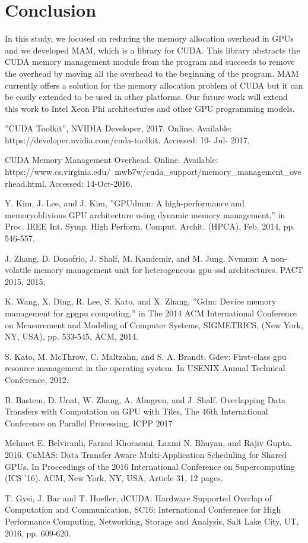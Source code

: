 \documentclass[conference]{IEEEtran}
\begin{document}
\section{Conclusion}
In this study, we focused on reducing the memory allocation overhead in GPUs and we developed MAM, which is a library for CUDA. This library abstracts the CUDA memory management module from the program and succeeds to remove the overhead by moving all the overhead to the beginning of the program. MAM currently offers a solution for the memory allocation problem of CUDA but it can be easily extended to be used in other platforms. Our future work will extend this work to Intel Xeon Phi architectures and other GPU programming models. 


\begin{thebibliography}{1}

''CUDA Toolkit'', NVIDIA Developer, 2017. \lbrack Online\rbrack . Available: https://developer.nvidia.com/cuda-toolkit. \lbrack Accessed: 10- Jul- 2017\rbrack .


CUDA Memory Management Overhead. \lbrack Online\rbrack . Available: https://www.cs.virginia.edu/~mwb7w/cuda\_support/memory\_management\_overhead.html. \lbrack Accessed: 14-Oct-2016\rbrack .

Y. Kim, J. Lee, and J. Kim, ''GPUdmm: A high-performance and memoryoblivious
GPU architecture using dynamic memory management,'' in
Proc. IEEE Int. Symp. High Perform. Comput. Archit. (HPCA), Feb. 2014,
pp. 546-557.

J. Zhang, D. Donofrio, J. Shalf, M. Kandemir, and M. Jung. Nvmmu:
A non-volatile memory management unit for heterogeneous gpu-ssd
architectures. PACT 2015, 2015.

K. Wang, X. Ding, R. Lee, S. Kato, and X. Zhang, ''Gdm:
Device memory management for gpgpu computing,'' in The
2014 ACM International Conference on Measurement and
Modeling of Computer Systems, SIGMETRICS, (New
York, NY, USA), pp. 533-545, ACM, 2014.

S. Kato, M. McThrow, C. Maltzahn, and S. A. Brandt. Gdev:
First-class gpu resource management in the operating system.
In USENIX Annual Technical Conference, 2012.

B. Bastem, D. Unat, W. Zhang, A. Almgren, and J. Shalf. 
Overlapping Data Transfers with Computation on GPU with Tiles, 
The 46th International Conference on Parallel Processing, ICPP 2017

Mehmet E. Belviranli, Farzad Khorasani, Laxmi N. Bhuyan, and Rajiv Gupta. 2016. CuMAS: Data Transfer Aware Multi-Application Scheduling for Shared GPUs. In Proceedings of the 2016 International Conference on Supercomputing (ICS '16). ACM, New York, NY, USA, Article 31, 12 pages. 

T. Gysi, J. Bar and T. Hoefler, 
dCUDA: Hardware Supported Overlap of Computation and Communication, 
SC16: International Conference for High Performance Computing, Networking, Storage and Analysis, Salt Lake City, UT, 2016, pp. 609-620.

\end{thebibliography}
\end{document}
